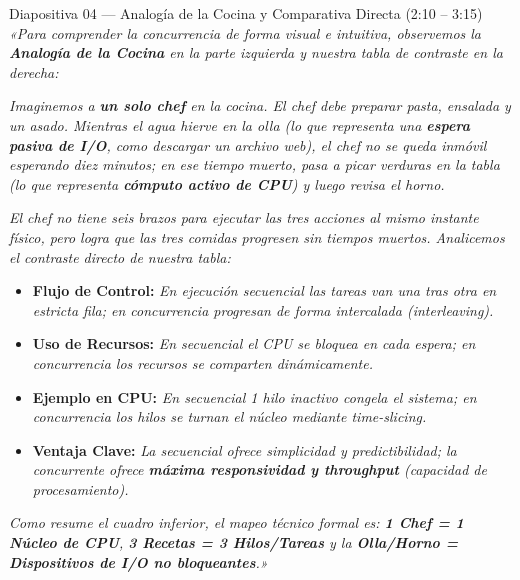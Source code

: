 \documentclass[11pt,a4paper]{article}
\begin{document}
\begin{guionbox}{Diapositiva 04 --- Analogía de la Cocina y Comparativa Directa (2:10 -- 3:15)}
\textit{«Para comprender la concurrencia de forma visual e intuitiva, observemos la \textbf{Analogía de la Cocina} en la parte izquierda y nuestra tabla de contraste en la derecha:}

\textit{Imaginemos a \textbf{un solo chef} en la cocina. El chef debe preparar pasta, ensalada y un asado. Mientras el agua hierve en la olla (lo que representa una \textbf{espera pasiva de I/O}, como descargar un archivo web), el chef no se queda inmóvil esperando diez minutos; en ese tiempo muerto, pasa a picar verduras en la tabla (lo que representa \textbf{cómputo activo de CPU}) y luego revisa el horno.}

\textit{El chef no tiene seis brazos para ejecutar las tres acciones al mismo instante físico, pero logra que las tres comidas progresen sin tiempos muertos. Analicemos el contraste directo de nuestra tabla:}
\begin{itemize}[leftmargin=5mm]
    \item \textbf{Flujo de Control:} \textit{En ejecución secuencial las tareas van una tras otra en estricta fila; en concurrencia progresan de forma intercalada (\textit{interleaving}).}
    \item \textbf{Uso de Recursos:} \textit{En secuencial el CPU se bloquea en cada espera; en concurrencia los recursos se comparten dinámicamente.}
    \item \textbf{Ejemplo en CPU:} \textit{En secuencial 1 hilo inactivo congela el sistema; en concurrencia los hilos se turnan el núcleo mediante time-slicing.}
    \item \textbf{Ventaja Clave:} \textit{La secuencial ofrece simplicidad y predictibilidad; la concurrente ofrece \textbf{máxima responsividad y throughput} (capacidad de procesamiento).}
\end{itemize}

\textit{Como resume el cuadro inferior, el mapeo técnico formal es: \textbf{1 Chef = 1 Núcleo de CPU}, \textbf{3 Recetas = 3 Hilos/Tareas} y la \textbf{Olla/Horno = Dispositivos de I/O no bloqueantes}.»}
\end{guionbox}
\end{document}

